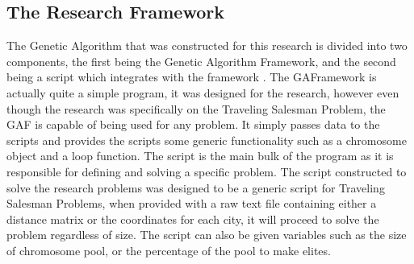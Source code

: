 \subsection{The Research Framework}
\par
The Genetic Algorithm that was constructed for this research is divided into two components, the first being the Genetic Algorithm Framework, and the second being a script which integrates with the framework \cite{Code}.
The GAFramework is actually quite a simple program, it was designed for the research, however even though the research was specifically on the Traveling Salesman Problem, the GAF is capable of being used for any problem. It simply passes data to the scripts and provides the scripts some generic functionality such as a chromosome object and a loop function.
The script is the main bulk of the program as it is responsible for defining and solving a specific problem. The script constructed to solve the research problems was designed to be a generic script for Traveling Salesman Problems, when provided with a raw text file containing either a distance matrix or the coordinates for each city, it will proceed to solve the problem regardless of size. The script can also be given variables such as the size of chromosome pool, or the percentage of the pool to make elites. 

